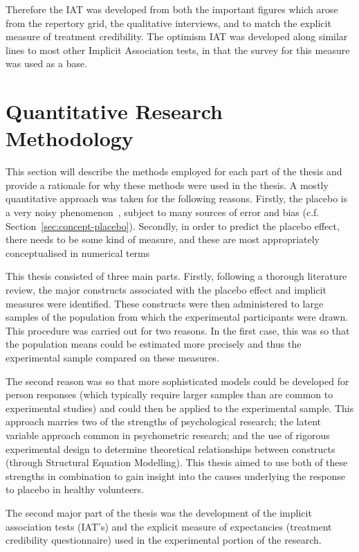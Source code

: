 Therefore the IAT was developed from both the important figures which arose from the repertory grid, the qualitative interviews, and to match the explicit measure of treatment credibility. The optimism IAT was developed along similar lines to most other Implicit Association tests, in that the survey for this measure was used as a base. 


\section{Quantitative Research Methodology}
\label{sec:quant-rese-meth}
This section  will describe the methods employed for each part of the thesis and provide a rationale for why these methods were used in the thesis.
A mostly quantitative approach was taken for the following reasons. Firstly, the placebo  is a very noisy phenomenon~\cite{Singer2005}, subject to many sources of error and bias (c.f. Section~\ref{sec:concept-placebo}). Secondly, in order to predict the placebo effect, there needs to be some kind of measure, and these are most appropriately conceptualised in numerical terms

This thesis consisted of three main parts. Firstly, following a thorough literature review, the major constructs associated with the placebo effect and implicit measures were identified. These constructs were then administered to large samples of the population from which the experimental participants were drawn. This procedure was carried out for two reasons. In the first case, this was so that the population means could be estimated more precisely and thus the experimental sample compared on these measures.  

The second reason was so that more sophisticated models could be developed for person responses (which typically require larger samples than are common to experimental studies) and could then be applied to the experimental sample. This approach marries two of the strengths of psychological research; the latent variable approach common in psychometric research; and  the use of rigorous experimental design to determine theoretical relationships between constructs (through Structural Equation Modelling). This thesis aimed to use both of these strengths in combination to gain insight into the causes underlying the response to placebo in healthy volunteers.

The second major part of the thesis was the development of the implicit association tests (IAT's) and the explicit measure of expectancies (treatment credibility questionnaire) used in the experimental portion of the research. 

